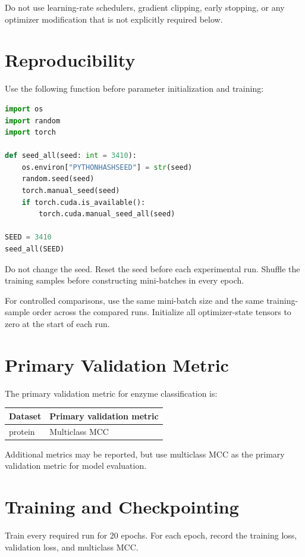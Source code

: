\documentclass[11pt]{article}
\begin{document}
Do not use learning-rate schedulers, gradient clipping, early stopping, or any optimizer modification that is not explicitly required below.

\section{Reproducibility}
Use the following function before parameter initialization and training:

\begin{lstlisting}[language=Python]
import os
import random
import torch

def seed_all(seed: int = 3410):
    os.environ["PYTHONHASHSEED"] = str(seed)
    random.seed(seed)
    torch.manual_seed(seed)
    if torch.cuda.is_available():
        torch.cuda.manual_seed_all(seed)

SEED = 3410
seed_all(SEED)
\end{lstlisting}

Do not change the seed. Reset the seed before each experimental run. Shuffle the training samples before constructing mini-batches in every epoch.

For controlled comparisons, use the same mini-batch size and the same training-sample order across the compared runs. Initialize all optimizer-state tensors to zero at the start of each run.

\section{Primary Validation Metric}
The primary validation metric for enzyme classification is:

\begin{center}
\begin{tabular}{ll}
\toprule
Dataset & Primary validation metric \\
\midrule
protein & Multiclass MCC \\
\bottomrule
\end{tabular}
\end{center}

Additional metrics may be reported, but use multiclass MCC as the primary validation metric for model evaluation.

\section{Training and Checkpointing}
Train every required run for 20 epochs. For each epoch, record the training loss, validation loss, and multiclass MCC.
\end{document}
